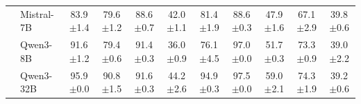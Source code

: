 \begin{table}[t]
\begin{tabular}{@{}ll ccccccccc@{}}
  & Mistral-7B     & 83.9{\scriptsize$\pm$1.4} & 79.6{\scriptsize$\pm$1.2} & 88.6{\scriptsize$\pm$0.7} & 42.0{\scriptsize$\pm$1.1} & 81.4{\scriptsize$\pm$1.9} & 88.6{\scriptsize$\pm$0.3} & 47.9{\scriptsize$\pm$1.6} & 67.1{\scriptsize$\pm$2.9} & 39.8{\scriptsize$\pm$0.6} \\

  & Qwen3-8B       & 91.6{\scriptsize$\pm$1.2} & 79.4{\scriptsize$\pm$0.6} & 91.4{\scriptsize$\pm$0.3} & 36.0{\scriptsize$\pm$0.9} & 76.1{\scriptsize$\pm$4.5} & 97.0{\scriptsize$\pm$0.0} & 51.7{\scriptsize$\pm$0.3} & 73.3{\scriptsize$\pm$0.9} & 39.0{\scriptsize$\pm$2.2} \\

  & Qwen3-32B      & 95.9{\scriptsize$\pm$0.0} & 90.8{\scriptsize$\pm$1.5} & 91.6{\scriptsize$\pm$0.3} & 44.2{\scriptsize$\pm$2.6} & 94.9{\scriptsize$\pm$0.3} & 97.5{\scriptsize$\pm$0.0} & 59.0{\scriptsize$\pm$2.1} & 74.3{\scriptsize$\pm$1.9} & 39.2{\scriptsize$\pm$0.6} \\
\bottomrule
\end{tabular}
\end{table}
